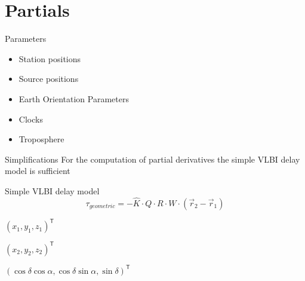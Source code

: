 \documentclass[14pt,table,t, c]{beamer}
\begin{document}
\part{Partials}

\begin{frame}{Parameters}

\begin{itemize}
  \item Station positions
  \item Source positions
  \item Earth Orientation Parameters
  \item Clocks
  \item Troposphere
\end{itemize}
\end{frame}

\begin{frame}{Simplifications}
For the computation of partial derivatives the simple VLBI delay model is sufficient
\vspace*{\baselineskip}
\begin{block}{Simple VLBI delay model}
\vspace*{-\baselineskip}\setlength\belowdisplayskip{0pt}\setlength\abovedisplayskip{0pt}
\begin{equation*}
\tau_{geometric} = - \hat{K} \cdot Q \cdot R \cdot W \cdot (\vec{r}_2 - \vec{r}_1)
\end{equation*}
\end{block}
\begin{description}[$\vec{r}_1$]
\item[$\vec{r}_1$] $(x_1, y_1, z_1)^\mathsf{T}$
\item[$\vec{r}_2$] $(x_2, y_2, z_2)^\mathsf{T}$
\item[$\hat{K}$] $(\cos \delta \cos \alpha, \cos \delta \sin \alpha, \sin \delta)^\mathsf{T}$
\end{description}
\end{frame}
\end{document}
